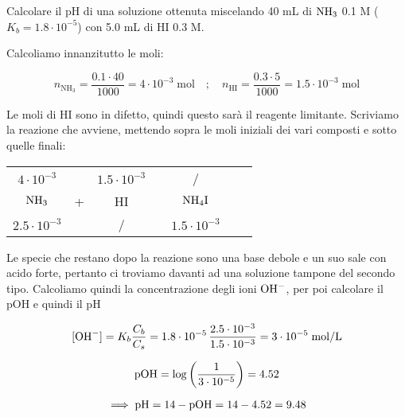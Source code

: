 \begin{esercizio}
    Calcolare il pH di una soluzione ottenuta miscelando 40 mL di $\rm NH_3$ 0.1 M ($K_b = 1.8 \cdot 10^{-5}$) con 5.0 mL di HI 0.3 M.
\end{esercizio}
\begin{soluzione}
    Calcoliamo innanzitutto le moli:

$$n_{\text{NH}_3}=\frac{0.1 \cdot 40}{1000}
=4 \cdot 10^{-3} \; \text{mol}
\quad ; \quad
n_{\text{HI}}=\frac{0.3 \cdot 5}{1000}
=1.5 \cdot 10^{-3} \;\text{mol}$$

Le moli di HI sono in difetto, quindi questo sarà il reagente limitante. Scriviamo la reazione che avviene, mettendo sopra le moli iniziali dei vari composti e sotto quelle finali:

\begin{center}
    \begin{tabular}{ccccccc}
        $4 \cdot 10^{-3}$ & & $1.5 \cdot 10^{-3}$ & & /\\
        $\rm NH_3$ & + & HI & \ce{->} & $\rm NH_4I$ \\
        $2.5 \cdot 10^{-3}$ & & / & & $1.5 \cdot 10^{-3}$\\
    \end{tabular}
\end{center}

Le specie che restano dopo la reazione sono una base debole e un suo sale con acido forte, pertanto ci troviamo davanti ad una soluzione tampone del secondo tipo. Calcoliamo quindi la concentrazione degli ioni $\rm OH^-$, per poi calcolare il pOH e quindi il pH

$$[\text{OH}^-]=K_b\frac{C_b}{C_s}
=1.8 \cdot 10^{-5}\,\frac{2.5 \cdot 10^{-3}}{1.5 \cdot 10^{-3}}
= 3 \cdot 10^{-5} \; \rm mol/L$$

$$\rm pOH=\log\left(\frac{1}{3 \cdot 10^{-5}}\right)=4.52$$

$$\implies \rm pH=14-pOH=14-4.52=9.48$$
\end{soluzione}

\newpage

